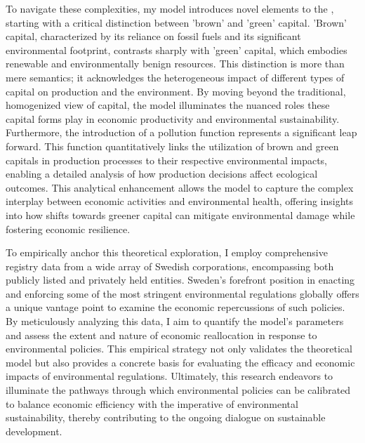 To navigate these complexities, my model introduces novel elements to the \cite{hsieh2009misallocation}, starting with a critical distinction between 'brown' and 'green' capital. 'Brown' capital, characterized by its reliance on fossil fuels and its significant environmental footprint, contrasts sharply with 'green' capital, which embodies renewable and environmentally benign resources. This distinction is more than mere semantics; it acknowledges the heterogeneous impact of different types of capital on production and the environment. By moving beyond the traditional, homogenized view of capital, the model illuminates the nuanced roles these capital forms play in economic productivity and environmental sustainability. Furthermore, the introduction of a pollution function represents a significant leap forward. This function quantitatively links the utilization of brown and green capitals in production processes to their respective environmental impacts, enabling a detailed analysis of how production decisions affect ecological outcomes. This analytical enhancement allows the model to capture the complex interplay between economic activities and environmental health, offering insights into how shifts towards greener capital can mitigate environmental damage while fostering economic resilience.

To empirically anchor this theoretical exploration, I employ comprehensive registry data from a wide array of Swedish corporations, encompassing both publicly listed and privately held entities. Sweden's forefront position in enacting and enforcing some of the most stringent environmental regulations globally offers a unique vantage point to examine the economic repercussions of such policies. By meticulously analyzing this data, I aim to quantify the model's parameters and assess the extent and nature of economic reallocation in response to environmental policies. This empirical strategy not only validates the theoretical model but also provides a concrete basis for evaluating the efficacy and economic impacts of environmental regulations. Ultimately, this research endeavors to illuminate the pathways through which environmental policies can be calibrated to balance economic efficiency with the imperative of environmental sustainability, thereby contributing to the ongoing dialogue on sustainable development.